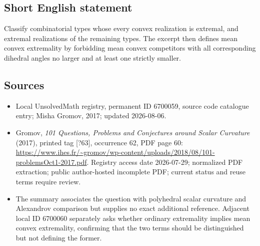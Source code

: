 \documentclass[11pt]{article}
\begin{document}
\subsection{Short English statement}
Classify combinatorial types whose every convex realization is extremal, and extremal realizations of the remaining types. The excerpt then defines mean convex extremality by forbidding mean convex competitors with all corresponding dihedral angles no larger and at least one strictly smaller.
\subsection{Sources}
\begin{itemize}
\item Local UnsolvedMath registry, permanent ID 6700059, source code catalogue entry; Misha Gromov, 2017; updated 2026-08-06.
\item Gromov, \emph{101 Questions, Problems and Conjectures around Scalar Curvature} (2017), printed tag [?63], occurrence 62, PDF page 60: \url{https://www.ihes.fr/~gromov/wp-content/uploads/2018/08/101-problemsOct1-2017.pdf}. Registry access date 2026-07-29; normalized PDF extraction; public author-hosted incomplete PDF; current status and reuse terms require review.
\item The summary associates the question with polyhedral scalar curvature and Alexandrov comparison but supplies no exact additional reference. Adjacent local ID 6700060 separately asks whether ordinary extremality implies mean convex extremality, confirming that the two terms should be distinguished but not defining the former.
\end{itemize}
\end{document}
